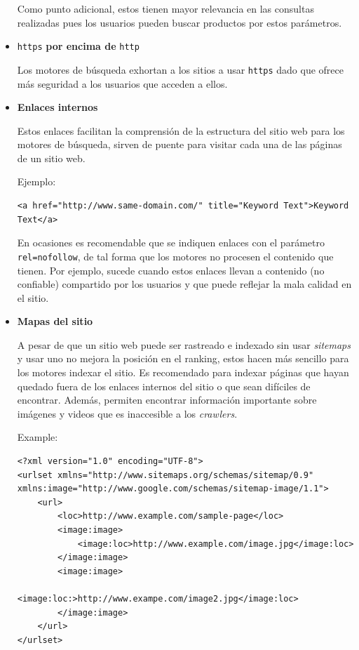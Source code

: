 \documentclass[12pt]{llncs}
\begin{document}
\begin{itemize}
Como punto adicional, estos tienen mayor relevancia en las consultas realizadas pues los usuarios pueden buscar productos por estos parámetros.

\item \verb+https+ \textbf{por encima de} \verb+http+

Los motores de búsqueda exhortan a los sitios a usar \verb+https+ dado que ofrece más seguridad a los usuarios que acceden a ellos.

\item \textbf{Enlaces internos}

Estos enlaces facilitan la comprensión de la estructura del sitio web para los motores de búsqueda, sirven de puente para visitar cada una de las páginas de un sitio web.

Ejemplo:
\begin{lstlisting}
<a href="http://www.same-domain.com/" title="Keyword Text">Keyword Text</a>    
\end{lstlisting}

En ocasiones es recomendable que se indiquen enlaces con el parámetro \verb+rel=nofollow+, de tal forma que los motores no procesen el contenido que tienen. Por ejemplo, sucede cuando estos enlaces llevan a contenido (no confiable) compartido por los usuarios y que puede reflejar la mala calidad en el sitio.

\item \textbf{Mapas del sitio} \cite{sitemaps}

A pesar de que un sitio web puede ser rastreado e indexado sin usar \textit{sitemaps} y usar uno no mejora la posición en el ranking, estos hacen más sencillo para los motores indexar el sitio. Es recomendado para indexar páginas que hayan quedado fuera de los enlaces internos del sitio o que sean difíciles de encontrar. Además, permiten encontrar información importante sobre imágenes y videos que es inaccesible a los \textit{crawlers}.

Example:
\lstset{language=XML}
\begin{lstlisting}
<?xml version="1.0" encoding="UTF-8">
<urlset xmlns="http://www.sitemaps.org/schemas/sitemap/0.9" xmlns:image="http://www.google.com/schemas/sitemap-image/1.1">
    <url>
        <loc>http://www.example.com/sample-page</loc>
        <image:image>
            <image:loc>http://www.example.com/image.jpg</image:loc>
        </image:image>
        <image:image>
            <image:loc:>http://www.exampe.com/image2.jpg</image:loc>
        </image:image>
    </url>
</urlset>
\end{lstlisting}


\end{itemize}
\end{document}
